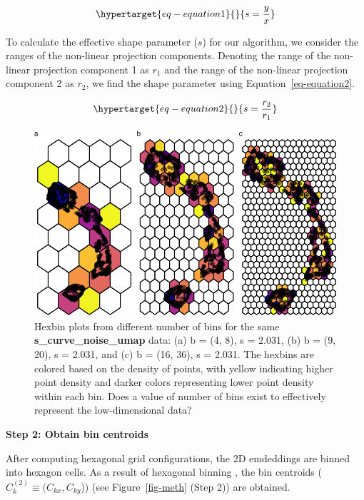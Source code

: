\documentclass[
  12pt]{article}
\begin{document}
\begin{equation}\protect\hypertarget{eq-equation1}{}{
  s = \frac{y}{x}
}\label{eq-equation1}\end{equation}

To calculate the effective shape parameter (\(s\)) for our algorithm, we
consider the ranges of the non-linear projection components. Denoting
the range of the non-linear projection component 1 as \(r_1\) and the
range of the non-linear projection component 2 as \(r_2\), we find the
shape parameter using Equation~\ref{eq-equation2}.

\begin{equation}\protect\hypertarget{eq-equation2}{}{
s = \frac{r_2}{r_1}
}\label{eq-equation2}\end{equation}

\begin{figure}[H]

{\centering \includegraphics{paper_files/figure-pdf/fig-binsize-1.pdf}

}

\caption{\label{fig-binsize}Hexbin plots from different number of bins
for the same \textbf{s\_curve\_noise\_umap} data: (a) b = (4, 8), s =
2.031, (b) b = (9, 20), s = 2.031, and (c) b = (16, 36), s = 2.031. The
hexbins are colored based on the density of points, with yellow
indicating higher point density and darker colors representing lower
point density within each bin. Does a value of number of bins exist to
effectively represent the low-dimensional data?}

\end{figure}

\textbf{Step 2: Obtain bin centroids}

After computing hexagonal grid configurations, the 2D emdeddings are
binned into hexagon cells. As a result of hexagonal binning , the bin
centroids (\(C_k^{(2)} \equiv (C_{kx}, C_{ky}\))) (see
Figure~\ref{fig-meth} (Step 2)) are obtained.
\end{document}

